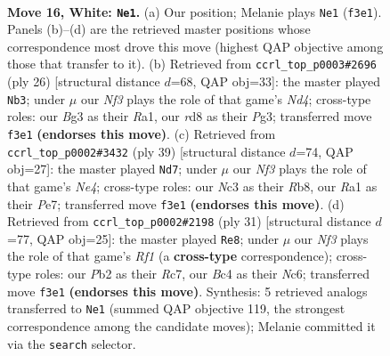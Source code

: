 \documentclass[11pt]{article}
\begin{document}
\clearpage

\begin{figure}[p]\centering
\begin{subfigure}{0.46\textwidth}\centering
\resizebox{\linewidth}{!}{%
\newchessgame
\chessboard[
  setfen={rnbr2k1/5p2/1p2pn2/p1b4p/2B3p1/2N1PNB1/PP3PPP/R1R3K1 w - - 0 16},
  showmover=false,
  pgfstyle=straightmove, color=movearrow, markmove={f3-e1}
]}
\caption{}
\end{subfigure}\hfill
\begin{subfigure}{0.46\textwidth}\centering
\resizebox{\linewidth}{!}{%
\newchessgame
\chessboard[
  setfen={rnb1r1k1/pp3p2/2p2n1p/2b3p1/3N1B2/2N3P1/PP2PPBP/R2R2K1 w - - 0 14},
  showmover=false,
  pgfstyle=straightmove, color=movearrow, markmove={d4-b3}
]}
\caption{}
\end{subfigure}
\\[4pt]
\begin{subfigure}{0.46\textwidth}\centering
\resizebox{\linewidth}{!}{%
\newchessgame
\chessboard[
  setfen={1r2r1k1/pp2ppb1/2bp2p1/3Nn3/2P2P2/1P4Pp/PB1RP2P/2R3KB b - - 0 20},
  showmover=false,
  pgfstyle=straightmove, color=movearrow, markmove={e5-d7}
]}
\caption{}
\end{subfigure}\hfill
\begin{subfigure}{0.46\textwidth}\centering
\resizebox{\linewidth}{!}{%
\newchessgame
\chessboard[
  setfen={5rk1/ppr2p1p/2nbpnpB/3p4/3P2P1/2PB3P/PP2NP2/R3K2R b KQ - 1 16},
  showmover=false,
  pgfstyle=straightmove, color=movearrow, markmove={f8-e8}
]}
\caption{}
\end{subfigure}
\caption{\textbf{Move 16, White: \texttt{Ne1}.} (a) Our position; Melanie plays \texttt{Ne1} (\texttt{f3e1}). Panels (b)--(d) are the retrieved master positions whose correspondence most drove this move (highest QAP objective among those that transfer to it). (b) Retrieved from \texttt{ccrl\_top\_p0003\#2696} (ply 26) [structural distance $d$=68, QAP obj=33]: the master played \texttt{Nb3}; under $\mu$ our \emph{Nf3} plays the role of that game's \emph{Nd4}; cross-type roles: our \emph{B}g3 as their \emph{R}a1, our \emph{r}d8 as their \emph{P}g3; transferred move \texttt{f3e1} \textbf{(endorses this move)}. (c) Retrieved from \texttt{ccrl\_top\_p0002\#3432} (ply 39) [structural distance $d$=74, QAP obj=27]: the master played \texttt{Nd7}; under $\mu$ our \emph{Nf3} plays the role of that game's \emph{Ne4}; cross-type roles: our \emph{N}c3 as their \emph{R}b8, our \emph{R}a1 as their \emph{P}e7; transferred move \texttt{f3e1} \textbf{(endorses this move)}. (d) Retrieved from \texttt{ccrl\_top\_p0002\#2198} (ply 31) [structural distance $d$=77, QAP obj=25]: the master played \texttt{Re8}; under $\mu$ our \emph{Nf3} plays the role of that game's \emph{Rf1} (a \textbf{cross-type} correspondence); cross-type roles: our \emph{P}b2 as their \emph{R}c7, our \emph{B}c4 as their \emph{N}c6; transferred move \texttt{f3e1} \textbf{(endorses this move)}. Synthesis: 5 retrieved analogs transferred to \texttt{Ne1} (summed QAP objective 119, the strongest correspondence among the candidate moves); Melanie committed it via the \texttt{search} selector.}
\label{fig:thought-m30}
\end{figure}
\end{document}
